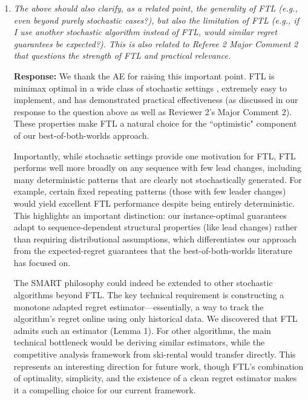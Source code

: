 \documentclass[11pt]{article}
\begin{document}
\begin{enumerate}
Regarding concrete examples where $g(n)$ is known, our framework applies broadly across online learning settings with established minimax bounds. For instance:
\begin{itemize}
\item Binary prediction: $g(n) = \sqrt{\frac{n}{2\pi}} + o(1) $ (Cover's minimax bound)
\item Prediction with expert advice: $g(n) = 2\sqrt{n \log m}$ (standard Hedge /exponential weights regret bound)
\item Online convex optimization: $g(n) = \sqrt{n}$ (for convex losses over bounded domains)
\item Small-loss settings: $g(L*) = 2\sqrt{L^* \log m}$ (adaptive Hedge bounds)
\end{itemize}


   \item   \emph{The above should also clarify, as a related point, the generality of FTL (e.g., even beyond purely stochastic cases?), but also the limitation of FTL (e.g., if I use another stochastic algorithm instead of FTL, would similar regret guarantees be expected?). This is also related to Referee 2 Major Comment 2 that questions the strength of FTL and practical relevance.}

    {\bf Response:} We thank the AE for raising this important point. FTL is minimax optimal in a wide class of stochastic settings \cite{kotlowski2018minimaxity}, extremely easy to implement, and has demonstrated practical effectiveness (as discussed in our response to the question above as well as Reviewer 2's Major Comment 2). These properties make FTL a natural choice for the ``optimistic" component of our best-of-both-worlds approach.

    Importantly, while stochastic settings provide one motivation for FTL, FTL performs well more broadly on any sequence with few lead changes, including many deterministic patterns that are clearly not stochastically generated. For example, certain fixed repeating patterns (those with few leader changes) would yield excellent FTL performance despite being entirely deterministic. This highlights an important distinction: our instance-optimal guarantees adapt to sequence-dependent structural properties (like lead changes) rather than requiring distributional assumptions, which differentiates our approach from the expected-regret guarantees that the best-of-both-worlds literature has focused on.
    
    The SMART philosophy could indeed be extended to other stochastic algorithms beyond FTL. The key technical requirement is constructing a monotone adapted regret estimator---essentially, a way to track the algorithm's regret online using only historical data. We discovered that FTL admits such an estimator (Lemma 1). For other algorithms, the main technical bottleneck would be deriving similar estimators, while the competitive analysis framework from ski-rental would transfer directly. This represents an interesting direction for future work, though FTL's combination of optimality, simplicity, and the existence of a clean regret estimator makes it a compelling choice for our current framework. 



\end{enumerate}
\end{document}
